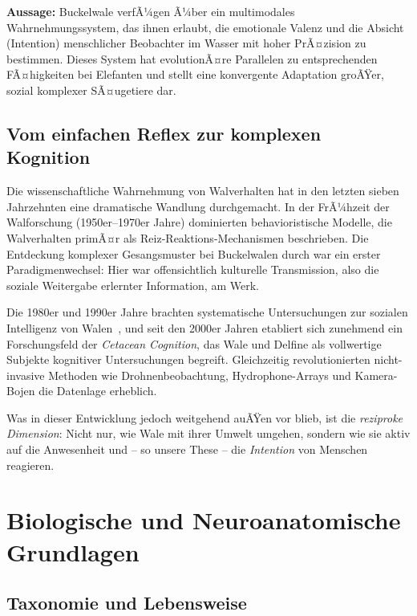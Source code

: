 ﻿\documentclass[12pt,a4paper]{article}
\theoremstyle{definition}
\theoremstyle{remark}
\begin{document}
\textbf{Aussage:} Buckelwale verfÃ¼gen Ã¼ber ein multimodales
  Wahrnehmungssystem, das ihnen erlaubt, die emotionale Valenz und die Absicht
  (Intention) menschlicher Beobachter im Wasser mit hoher PrÃ¤zision zu
  bestimmen. Dieses System hat evolutionÃ¤re Parallelen zu entsprechenden
  FÃ¤higkeiten bei Elefanten und stellt eine konvergente Adaptation groÃŸer,
  sozial komplexer SÃ¤ugetiere dar.

\subsection{Vom einfachen Reflex zur komplexen Kognition}

Die wissenschaftliche Wahrnehmung von Walverhalten hat in den letzten sieben
Jahrzehnten eine dramatische Wandlung durchgemacht. In der FrÃ¼hzeit der Walforschung
(1950er--1970er Jahre) dominierten behavioristische Modelle, die Walverhalten
primÃ¤r als Reiz-Reaktions-Mechanismen beschrieben. Die Entdeckung komplexer
Gesangsmuster bei Buckelwalen durch \cite{payne1971songs} war ein erster
Paradigmenwechsel: Hier war offensichtlich kulturelle Transmission, also die
soziale Weitergabe erlernter Information, am Werk.

Die 1980er und 1990er Jahre brachten systematische Untersuchungen zur sozialen
Intelligenz von Walen~\cite{connor1992dolphin}, und seit den 2000er Jahren
etabliert sich zunehmend ein Forschungsfeld der \emph{Cetacean Cognition}, das
Wale und Delfine als vollwertige Subjekte kognitiver Untersuchungen begreift.
Gleichzeitig revolutionierten nicht-invasive Methoden wie Drohnenbeobachtung,
Hydrophone-Arrays und Kamera-Bojen die Datenlage erheblich.

Was in dieser Entwicklung jedoch weitgehend auÃŸen vor blieb, ist die
\emph{reziproke Dimension}: Nicht nur, wie Wale mit ihrer Umwelt umgehen,
sondern wie sie aktiv auf die Anwesenheit und -- so unsere These -- die
\emph{Intention} von Menschen reagieren.

\section{Biologische und Neuroanatomische Grundlagen}
\label{sec:biologie}

\subsection{Taxonomie und Lebensweise}
\end{document}
